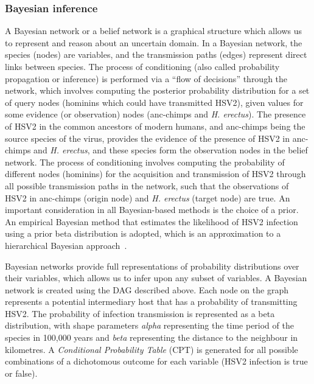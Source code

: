 \documentclass[fleqn,10pt]{wlscirep}
\begin{document}
\subsubsection*{Bayesian inference}
A Bayesian network or a belief network is a graphical structure which allows us to represent and reason about an uncertain domain. In a Bayesian network, the species (nodes) are variables, and the transmission paths (edges) represent direct links between species. The process of conditioning (also called probability propagation or inference) is performed via a ``flow of decisions'' through the network, which involves computing the posterior probability distribution for a set of query nodes (hominins which could have transmitted HSV2), given values for some evidence (or observation) nodes (anc-chimps and \textit{H. erectus}). The presence of HSV2 in the common ancestors of modern humans, and anc-chimps being the source species of the virus, provides the evidence of the presence of HSV2 in anc-chimps and \textit{H. erectus}, and these species form the observation nodes in the belief network. The process of conditioning involves computing the probability of different nodes (hominins) for the acquisition and transmission of HSV2 through all possible transmission paths in the network, such that the observations of HSV2 in anc-chimps (origin node) and \textit{H. erectus} (target node) are true. An important consideration in all Bayesian-based methods is the choice of a prior. An empirical Bayesian method that estimates the likelihood of HSV2 infection using a prior beta distribution is adopted, which is an approximation to a hierarchical Bayesian approach~\citep{Farine2015,Murphy2012}.

 
Bayesian networks provide full representations of probability distributions over their variables, which allows us to infer upon any subset of variables. A Bayesian network is created using the DAG described above. Each node on the graph represents a potential intermediary host that has a probability of transmitting HSV2. The probability of infection transmission is represented as a beta distribution, with shape parameters \textit{alpha} representing the time period of the species in 100,000 years and \textit{beta} representing the distance to the neighbour in kilometres. A \textit{Conditional Probability Table} (CPT) is generated for all possible combinations of a dichotomous outcome for each variable (HSV2 infection is true or false).
\end{document}
